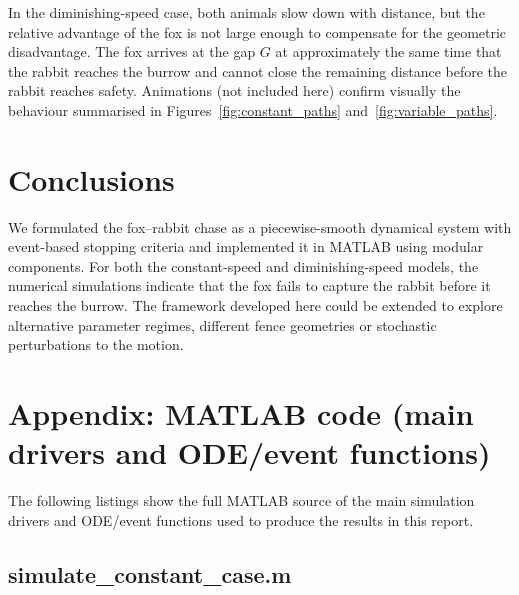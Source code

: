 \documentclass[a4paper,11pt]{article}
\begin{document}
In the diminishing-speed case, both animals slow down with distance, but the relative advantage of the fox is not large enough to compensate for the geometric disadvantage. The fox arrives at the gap $G$ at approximately the same time that the rabbit reaches the burrow and cannot close the remaining distance before the rabbit reaches safety. Animations (not included here) confirm visually the behaviour summarised in Figures~\ref{fig:constant_paths} and~\ref{fig:variable_paths}.

\section{Conclusions}

We formulated the fox--rabbit chase as a piecewise-smooth dynamical system with event-based stopping criteria and implemented it in \textsc{MATLAB} using modular components. For both the constant-speed and diminishing-speed models, the numerical simulations indicate that the fox fails to capture the rabbit before it reaches the burrow. The framework developed here could be extended to explore alternative parameter regimes, different fence geometries or stochastic perturbations to the motion.

\appendix
\section*{Appendix: MATLAB code (main drivers and ODE/event functions)}

The following listings show the full MATLAB source of the main simulation drivers and ODE/event
functions used to produce the results in this report.

\subsection*{simulate\_constant\_case.m}
\end{document}
